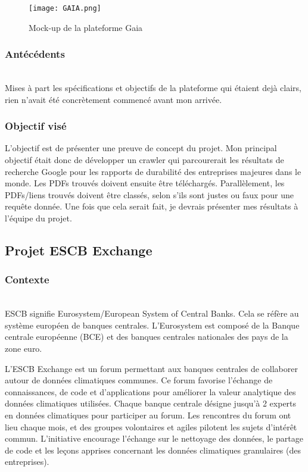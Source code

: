 \begin{figure}[H]
    \centering
    \texttt{[image: GAIA.png]}
    \caption{Mock-up de la plateforme Gaia}
\end{figure}

\subsubsection{Antécédents}
~\\
Mises à part les spécifications et objectifs de la plateforme qui étaient dejà clairs, rien n'avait été concrètement commencé avant mon arrivée.
\subsubsection{Objectif visé}

L'objectif est de présenter une preuve de concept du projet.
Mon principal objectif était donc de développer un crawler qui parcourerait les résultats de recherche Google pour les rapports de durabilité des entreprises majeures dans le monde.
Les PDFs trouvés doivent ensuite être téléchargés. 
Parallèlement, les PDFs/liens trouvés doivent être classés, selon s'ils sont justes ou faux pour une requête donnée.
Une fois que cela serait fait, je devrais présenter mes résultats à l'équipe du projet.

\pagebreak
\subsection{Projet ESCB Exchange}

\subsubsection{Contexte}
~\\
ESCB signifie Eurosystem/European System of Central Banks. Cela se réfère au système européen de banques centrales. 
L'Eurosystem est composé de la Banque centrale européenne (BCE) et des banques centrales nationales des pays de la zone euro. 

L'ESCB Exchange est un forum permettant aux banques centrales de collaborer autour de données climatiques communes. 
Ce forum favorise l'échange de connaissances, de code et d'applications pour améliorer la valeur analytique des données climatiques utilisées. 
Chaque banque centrale désigne jusqu'à 2 experts en données climatiques pour participer au forum. 
Les rencontres du forum ont lieu chaque mois, et des groupes volontaires et agiles pilotent les sujets d'intérêt commun. 
L'initiative encourage l'échange sur le nettoyage des données, le partage de code et les leçons apprises concernant les données climatiques granulaires (des entreprises).

